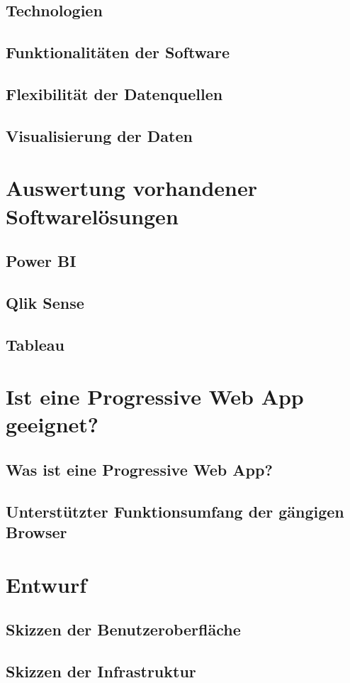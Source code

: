 \subsection{Technologien}

\subsection{Funktionalitäten der Software}

\subsection{Flexibilität der Datenquellen}

\subsection{Visualisierung der Daten}

\section{Auswertung vorhandener Softwarelösungen}

\subsection{Power BI}

\subsection{Qlik Sense}

\subsection{Tableau}

\section{Ist eine Progressive Web App geeignet?}

\subsection{Was ist eine Progressive Web App?}

\subsection{Unterstützter Funktionsumfang der gängigen Browser}

\section{Entwurf}

\subsection{Skizzen der Benutzeroberfläche}

\subsection{Skizzen der Infrastruktur}
